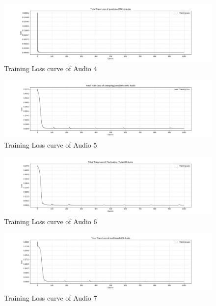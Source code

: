 \documentclass{ioereport}
\begin{document}
    \begin{figure}[H]
        \centering
        \includegraphics[width=\linewidth]{assets/audio_results/loss_curve/training_loss_curve_puretone5000hz.png}
        \caption{Training Loss curve of Audio 4}
        \label{fig:loss-curve-4}
    \end{figure}
    \begin{figure}[H]
        \centering
        \includegraphics[width=\linewidth]{assets/audio_results/loss_curve/training_loss_curve_sweeping_tone200-500hz.png}
        \caption{Training Loss curve of Audio 5}
        \label{fig:loss-curve-5}
    \end{figure}
    \begin{figure}[H]
        \centering
        \includegraphics[width=\linewidth]{assets/audio_results/loss_curve/training_loss_curve_fluctuating_tone400.png}
        \caption{Training Loss curve of Audio 6}
        \label{fig:loss-curve-6}
    \end{figure}
    \begin{figure}[H]
        \centering
        \includegraphics[width=\linewidth]{assets/audio_results/loss_curve/training_loss_curve_multitoneA4E4.png}
        \caption{Training Loss curve of Audio 7}
        \label{fig:loss-curve-7}
    \end{figure}
\end{document}
